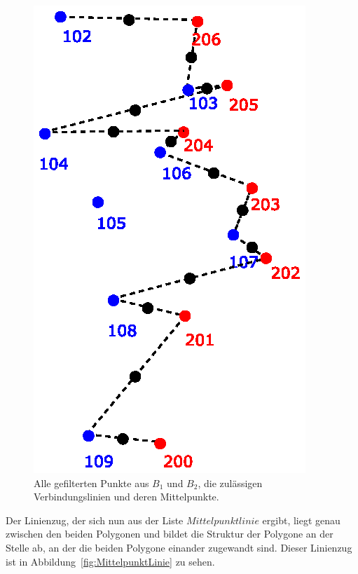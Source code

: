 \begin{figure}
	\centering
	\includegraphics[scale=0.6]{Mittelpunkte.eps}
	\caption[Verbindungslinien und deren Mittelpunkte]{Alle gefilterten Punkte aus $B_1$ und $B_2$, die zulässigen Verbindungslinien und deren Mittelpunkte.}
	\label{fig:Mittelpunkte}
\end{figure}

Der Linienzug, der sich nun aus der Liste $Mittelpunktlinie$ ergibt, liegt genau zwischen den beiden Polygonen und bildet die Struktur der Polygone an der Stelle ab, an der die beiden Polygone einander zugewandt sind. Dieser Linienzug ist in Abbildung~\vref{fig:MittelpunktLinie} zu sehen.


